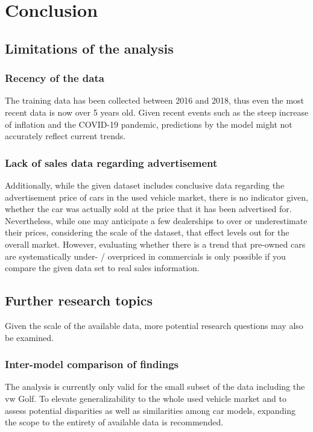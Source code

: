 \chapter{Conclusion}
\section{Limitations of the analysis}
\subsection{Recency of the data}
The training data has been collected between 2016 and 2018, thus even the most recent data
is now over 5 years old. Given recent events such as the steep increase of inflation
and the COVID-19 pandemic, predictions by the model might not accurately reflect current trends.

\subsection{Lack of sales data regarding advertisement}
Additionally, while the given dataset includes conclusive data regarding the advertisement price of cars in the used vehicle market,
there is no indicator given, whether the car was actually sold at the price that it has been advertised for. 
\newline
Nevertheless, while one may anticipate a few dealerships to over or underestimate their prices,
considering the scale of the dataset, that effect levels out for the overall market.
However, evaluating whether there is a trend that pre-owned cars are systematically under- / overpriced in commercials
is only possible if you compare the given data set to real sales information.

\section{Further research topics}
Given the scale of the available data, more potential research questions may also be examined. 

\subsection{Inter-model comparison of findings}
The analysis is currently only valid for the small subset of the data including the \ac{vw} Golf. 
To elevate generalizability to the whole used vehicle market and to assess potential disparities as well as similarities among
car models, expanding the scope to the entirety of available data is recommended.  
